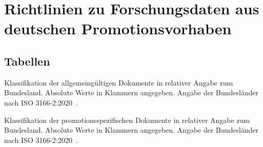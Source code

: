 \chapter{Richtlinien zu Forschungsdaten aus deutschen Promotionsvorhaben}\label{appendix:richtlinienklassifikation}
\section{Tabellen}
\begin{table}[!htbp]
	\caption{Klassifikation der allgemeingültigen Dokumente in relativer Angabe zum Bundesland.
	Absolute Werte in Klammern angegeben.
	Angabe der Bundesländer nach ISO 3166-2:2020~\autocite{ISO3166}.}
    
	\label{tab:stichprobe-klassifikation-allgemein-bundesland}
\end{table}

\newpage
\begin{table}[!htbp]
	\caption{Klassifikation der promotionsspezifischen Dokumente in relativer Angabe zum Bundesland.
	Absolute Werte in Klammern angegeben.
	Angabe der Bundesländer nach ISO 3166-2:2020~\autocite{ISO3166}.}
    
	\label{tab:stichprobe-klassifikation-spezifisch-bundesland}
\end{table}